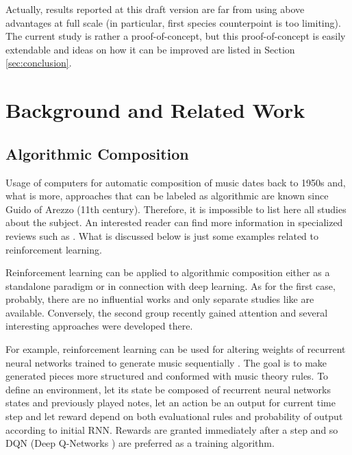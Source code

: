 \documentclass{article}
\begin{document}
Actually, results reported at this draft version are far from using above advantages at full scale (in particular, first species counterpoint is too limiting). The current study is rather a proof-of-concept, but this proof-of-concept is easily extendable and ideas on how it can be improved are listed in Section \ref{sec:conclusion}.


\section{Background and Related Work}
\label{sec:literature}

\subsection{Algorithmic Composition}
\label{subsec:composition}

Usage of computers for automatic composition of music dates back to 1950s and, what is more, approaches that can be labeled as algorithmic are known since Guido of Arezzo (11th century). Therefore, it is impossible to list here all studies about the subject. An interested reader can find more information in specialized reviews such as \cite{fernandez2013ai}. What is discussed below is just some examples related to reinforcement learning.

Reinforcement learning can be applied to algorithmic composition either as a standalone paradigm or in connection with deep learning. As for the first case, probably, there are no influential works and only separate studies like \cite{yi2007automatic} are available. Conversely, the second group recently gained attention and several interesting approaches were developed there.

For example, reinforcement learning can be used for altering weights of recurrent neural networks trained to generate music sequentially \cite{jaques2016generating, kotecha2018bach}. The goal is to make generated pieces more structured and conformed with music theory rules. To define an environment, let its state be composed of recurrent neural networks states and previously played notes, let an action be an output for current time step and let reward depend on both evaluational rules and probability of output according to initial RNN. Rewards are granted immediately after a step and so DQN (Deep Q-Networks \cite{mnih2013playing}) are preferred as a training algorithm.
\end{document}
